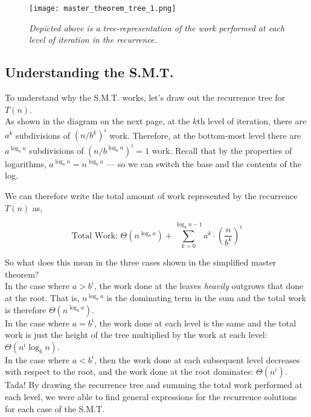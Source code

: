 \begin{figure}[ht]
    \centering
    \texttt{[image: master\_theorem\_tree\_1.png]}
    \caption*{\textit{Depicted above is a tree-representation of the work performed at each level of iteration in the recurrence.}}
\end{figure}

\subsection*{Understanding the S.M.T.}

To understand why the S.M.T. works, let's draw out the recurrence tree for $T(n)$. \\

As shown in the diagram on the next page, at the $k$th level of iteration, there are $a^k$ subdivisions of $(n/b^k)^i$ work. Therefore, at the bottom-most level there are $a^{\log_b n}$ subdivisions of $(n/b^{\log_b n})^i = 1$ work. Recall that by the properties of logarithms, $a^{\log_b n} = n^{\log_b a}$ --- so we can switch the base and the contents of the log.

We can therefore write the total amount of work represented by the recurrence $T(n)$ as,

$$\text{Total Work: }\Theta(n^{\log_b a}) + \sum_{k=0}^{\log_b{n-1}} a^k\cdot (\frac{n}{b^k})^i$$

So what does this mean in the three cases shown in the simplified master theorem?\\

In the case where $a > b^i$, the work done at the leaves \textit{heavily} outgrows that done at the root. That is, $n^{\log_b a}$ is the dominating term in the sum and the total work is therefore $\Theta(n^{\log_b a})$.\\

In the case where $a = b^i$, the work done at each level is the same and the total work is just the height of the tree multiplied by the work at each level: $\Theta(n^i \log_b n)$.\\

In the case where $a < b^i$, then the work done at each subsequent level decreases with respect to the root, and the work done at the root dominates: $\Theta(n^i)$.\\

Tada! By drawing the recurrence tree and summing the total work performed at each level, we were able to find general expressions for the recurrence solutions for each case of the S.M.T.

